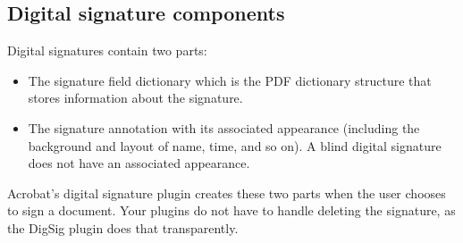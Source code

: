 \documentclass[letterpaper,12pt,english,openany,oneside]{sphinxmanual}
\begin{document}
\subsection{Digital signature components}
\label{\detokenize{Plugins_ExtendedAPI:digital-signature-components}}
Digital signatures contain two parts:
\begin{itemize}
\item {} 
The signature field dictionary which is the PDF dictionary structure that stores information about the signature.

\item {} 
The signature annotation with its associated appearance (including the background and layout of name, time, and so on). A blind digital signature does not have an associated appearance.

\end{itemize}

Acrobat’s digital signature plugin creates these two parts when the user chooses to sign a document. Your plugins do not have to handle deleting the signature, as the DigSig plugin does that transparently.
\end{document}
